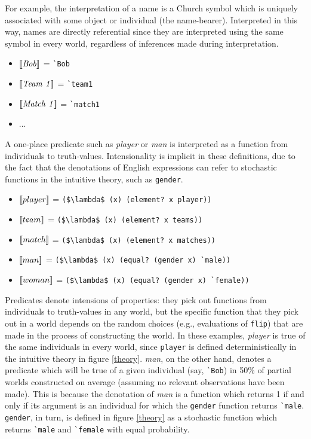 \documentclass[12pt]{article}
\newcommand{\llbracket}{\ensuremath{\left [\!\left [}}%
\newcommand{\rrbracket}{\ensuremath{\right ]\!\right ]}}
\providecommand{\sv}[1]{\ensuremath{\llbracket #1 \rrbracket}}
\newcommand{\denot}[1]{\ensuremath{\llbracket \mathit{#1} \rrbracket}}
\begin{document}
For example, the interpretation of a name is a Church symbol which is uniquely associated with some object or individual (the name-bearer). 
Interpreted in this way, names are directly referential since they are interpreted using the same symbol in every world, regardless of inferences made during interpretation. 
\begin{itemize}
\item \denot{Bob} = \lstinline{`Bob}
\item \denot{Team\ 1} = \lstinline{`team1}
\item \denot{Match\ 1} = \lstinline{`match1}
\item ...
\end{itemize}
A one-place predicate such as \emph{player} or \emph{man} is interpreted as a function from individuals to truth-values. 
Intensionality is implicit in these definitions, due to the fact that the denotations of English expressions can refer to stochastic functions in the intuitive theory, such as \lstinline{gender}.
\begin{itemize}
\item \sv{player} = \lstinline[mathescape]{($\lambda$ (x) (element? x player))}  
\item \sv{team} = \lstinline[mathescape]{($\lambda$ (x) (element? x teams))}
\item \sv{match} = \lstinline[mathescape]{($\lambda$ (x) (element? x matches))}
\item \sv{man} = \lstinline[mathescape]{($\lambda$ (x) (equal? (gender x) `male))}
\item \sv{woman} = \lstinline[mathescape]{($\lambda$ (x) (equal? (gender x) `female))}
\end{itemize}
Predicates denote intensions of properties: they pick out functions from individuals to truth-values in any world, but the specific function that they pick out in a world depends on the random choices (e.g., evaluations of \lstinline{flip}) that are made in the process of constructing the world. 
In these examples, \emph{player} is true of the same individuals in every world, since \lstinline{player} is defined deterministically in the intuitive theory in figure \ref{theory}. 
\emph{man}, on the other hand, denotes a predicate which will be true of a given individual (say, \lstinline{`Bob}) in 50\% of partial worlds constructed on average (assuming no relevant observations have been made). 
This is because the denotation of \emph{man} is a function which returns 1 if and only if its argument is an individual for which the \lstinline{gender} function returns \lstinline{`male}. 
\lstinline{gender}, in turn, is defined in figure \ref{theory} as a stochastic function which returns \lstinline{`male} and \lstinline{`female} with equal probability. 
\end{document}
